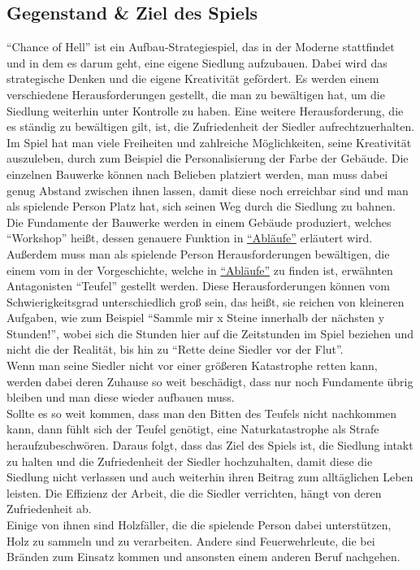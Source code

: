 \documentclass[paper=A4,pagesize=auto,12pt,headinclude=true,footinclude=true,BCOR=0mm,DIV=calc]{scrartcl}
\newcommand{\gametitle}{Chance of Hell}
\begin{document}
\subsection{Gegenstand \& Ziel des Spiels}\label{sec:Gegenstand}
"`\gametitle"' \space ist ein Aufbau-Strategiespiel, das in der Moderne stattfindet und in dem es darum geht, eine eigene Siedlung aufzubauen. Dabei wird das strategische Denken und die eigene Kreativität gefördert. Es werden einem verschiedene Herausforderungen gestellt, die man zu bewältigen hat, um die Siedlung weiterhin unter Kontrolle zu haben. Eine weitere Herausforderung, die es ständig zu bewältigen gilt, ist, die Zufriedenheit der Siedler aufrechtzuerhalten. \\
Im Spiel hat man viele Freiheiten und zahlreiche Möglichkeiten, seine Kreativität auszuleben, durch zum Beispiel die Personalisierung der Farbe der Gebäude. Die einzelnen Bauwerke können nach Belieben platziert werden, man muss dabei genug Abstand zwischen ihnen lassen, damit diese noch erreichbar sind und man als spielende Person Platz hat, sich seinen Weg durch die Siedlung zu bahnen. \\
Die Fundamente der Bauwerke werden in einem Gebäude produziert, welches "`Workshop"' heißt, dessen genauere Funktion in \hyperref[sec:Ablaeufe]{"`Abläufe"'} erläutert wird.\\
Außerdem muss man als spielende Person Herausforderungen bewältigen, die einem vom in der Vorgeschichte, welche in \hyperref[sec:Ablaeufe]{"`Abläufe"'} zu finden ist, erwähnten Antagonisten "`Teufel"' gestellt werden. Diese Herausforderungen können vom Schwierigkeitsgrad unterschiedlich groß sein, das heißt, sie reichen von kleineren Aufgaben, wie zum Beispiel "`Sammle mir x Steine innerhalb der nächsten y Stunden!"', wobei sich die Stunden hier auf die Zeitstunden im Spiel beziehen und nicht die der Realität, bis hin zu "`Rette deine Siedler vor der Flut"'. \\
Wenn man seine Siedler nicht vor einer größeren Katastrophe retten kann, werden dabei deren Zuhause so weit beschädigt, dass nur noch Fundamente übrig bleiben und man diese wieder aufbauen muss. \\
Sollte es so weit kommen, dass man den Bitten des Teufels nicht nachkommen kann, dann fühlt sich der Teufel genötigt, eine Naturkatastrophe als Strafe heraufzubeschwören.
Daraus folgt, dass das Ziel des Spiels ist, die Siedlung intakt zu halten und die %
 Zufriedenheit der Siedler hochzuhalten, damit diese die Siedlung nicht verlassen und auch weiterhin ihren Beitrag zum alltäglichen Leben leisten. Die Effizienz der Arbeit, die die Siedler verrichten, hängt von deren Zufriedenheit ab. \\
Einige von ihnen sind Holzfäller, die die spielende Person dabei unterstützen, Holz zu sammeln und zu verarbeiten. Andere sind Feuerwehrleute, die bei Bränden zum Einsatz kommen und ansonsten einem anderen Beruf nachgehen.
\end{document}
